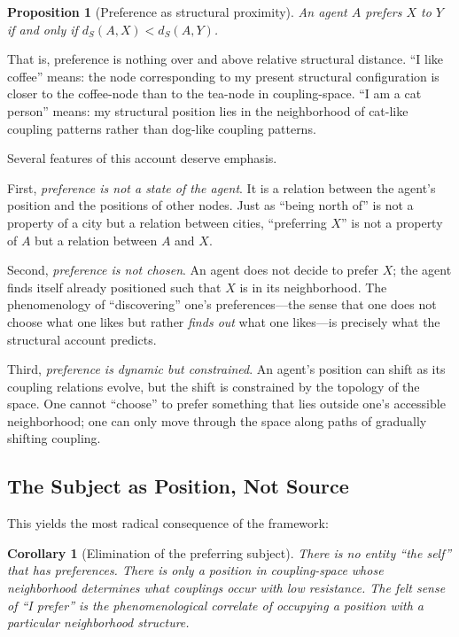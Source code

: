 \documentclass[12pt,a4paper]{article}
\newtheorem{proposition}{Proposition}[section]
\newtheorem{corollary}{Corollary}[section]
\begin{document}
\begin{proposition}[Preference as structural proximity]
An agent $A$ prefers $X$ to $Y$ if and only if $d_S(A, X) < d_S(A, Y)$.
\end{proposition}

That is, preference is nothing over and above relative structural distance. ``I like coffee'' means: the node corresponding to my present structural configuration is closer to the coffee-node than to the tea-node in coupling-space. ``I am a cat person'' means: my structural position lies in the neighborhood of cat-like coupling patterns rather than dog-like coupling patterns.

Several features of this account deserve emphasis.

First, \emph{preference is not a state of the agent}. It is a relation between the agent's position and the positions of other nodes. Just as ``being north of'' is not a property of a city but a relation between cities, ``preferring $X$'' is not a property of $A$ but a relation between $A$ and $X$.

Second, \emph{preference is not chosen}. An agent does not decide to prefer $X$; the agent finds itself already positioned such that $X$ is in its neighborhood. The phenomenology of ``discovering'' one's preferences---the sense that one does not choose what one likes but rather \emph{finds out} what one likes---is precisely what the structural account predicts.

Third, \emph{preference is dynamic but constrained}. An agent's position can shift as its coupling relations evolve, but the shift is constrained by the topology of the space. One cannot ``choose'' to prefer something that lies outside one's accessible neighborhood; one can only move through the space along paths of gradually shifting coupling.

\subsection{The Subject as Position, Not Source}

This yields the most radical consequence of the framework:

\begin{corollary}[Elimination of the preferring subject]
There is no entity ``the self'' that \emph{has} preferences. There is only a position in coupling-space whose neighborhood determines what couplings occur with low resistance. The felt sense of ``I prefer'' is the phenomenological correlate of occupying a position with a particular neighborhood structure.
\end{corollary}
\end{document}
